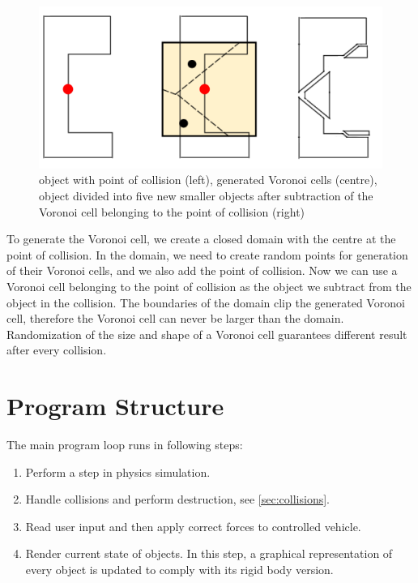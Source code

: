\begin{figure}
        \centering
        \includegraphics[width=\textwidth]{img/subtractionProcess}
        \caption{object with point of collision (left), generated Voronoi cells (centre), object divided into five new smaller objects after subtraction of the Voronoi cell belonging to the point of collision (right)}
        \label{fig:subtraction}
\end{figure}

To generate the Voronoi cell, we create a closed domain with the centre at the point of collision. In the domain, we need to create random points for generation of their Voronoi cells, and we also add the point of collision. Now we can use a Voronoi cell belonging to the point of collision as the object we subtract from the object in the collision. The boundaries of the domain clip the generated Voronoi cell, therefore the Voronoi cell can never be larger than the domain. Randomization of the size and shape of a Voronoi cell guarantees different result after every collision.

\section{Program Structure}
The main program loop runs in following steps:
\begin{enumerate}
\item Perform a step in physics simulation.
\item Handle collisions and perform destruction, see \cref{sec:collisions}.
\item Read user input and then apply correct forces to controlled vehicle.
\item Render current state of objects. In this step, a graphical representation of every object is updated to comply with its rigid body version.
\end{enumerate}

